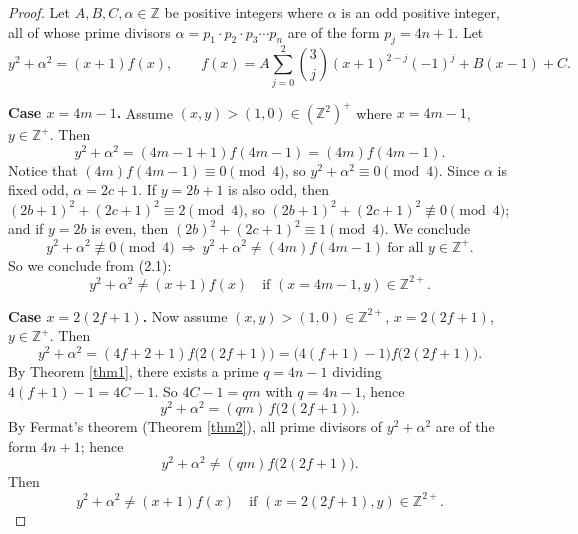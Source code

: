 \documentclass[11pt]{amsart}
\begin{document}
\begin{proof}
Let $A,B,C,\alpha\in\mathbb{Z}$ be positive integers where $\alpha$ is an odd positive integer, all of whose prime divisors $\alpha=p_1\cdot p_2\cdot p_3\cdots p_n$ are of the form $p_j=4n+1$. Let
\[
y^2+\alpha^2 = (x+1)f(x), \qquad f(x)=A\sum_{j=0}^2\binom{3}{j}(x+1)^{2-j}(-1)^j+B(x-1)+C.
\]

\textbf{Case $x=4m-1$.} Assume $(x,y)>(1,0)\in(\mathbb{Z}^2)^+$ where $x=4m-1$, $y\in\mathbb{Z}^+$. Then
\[
y^2+\alpha^2 = (4m-1+1)f(4m-1) = (4m)f(4m-1).
\]
Notice that $(4m)f(4m-1)\equiv 0\pmod 4$, so $y^2+\alpha^2\equiv 0\pmod 4$. Since $\alpha$ is fixed odd, $\alpha=2c+1$. If $y=2b+1$ is also odd, then $(2b+1)^2+(2c+1)^2\equiv 2\pmod 4$, so $(2b+1)^2+(2c+1)^2\not\equiv 0\pmod4$; and if $y=2b$ is even, then $(2b)^2+(2c+1)^2\equiv 1\pmod 4$. We conclude
\begin{equation}
y^2+\alpha^2\not\equiv 0\pmod 4 \ \Rightarrow\ y^2+\alpha^2\ne (4m)f(4m-1)\ \text{for all } y\in\mathbb{Z}^+. \tag{2.1}
\end{equation}
So we conclude from (2.1):
\begin{equation}
y^2+\alpha^2 \ne (x+1)f(x) \quad\text{if } (x=4m-1,y)\in\mathbb{Z}^{2+}. \tag{2.2}
\end{equation}

\textbf{Case $x=2(2f+1)$.} Now assume $(x,y)>(1,0)\in\mathbb{Z}^{2+}$, $x=2(2f+1)$, $y\in\mathbb{Z}^+$. Then
\[
y^2+\alpha^2=(4f+2+1)f\big(2(2f+1)\big) = \big(4(f+1)-1\big) f\big(2(2f+1)\big).
\]
By Theorem \ref{thm1}, there exists a prime $q=4n-1$ dividing $4(f+1)-1=4C-1$. So $4C-1=qm$ with $q=4n-1$, hence
\begin{equation}
y^2+\alpha^2 = (qm)\,f\big(2(2f+1)\big). \tag{2.3}
\end{equation}
By Fermat's theorem (Theorem \ref{thm2}), all prime divisors of $y^2+\alpha^2$ are of the form $4n+1$; hence
\begin{equation}
y^2+\alpha^2 \ne (qm)f\big(2(2f+1)\big). \tag{2.4}
\end{equation}
Then
\begin{equation}
y^2+\alpha^2 \ne (x+1)f(x) \quad\text{if } (x=2(2f+1),y)\in\mathbb{Z}^{2+}. \tag{2.5}
\end{equation}


\end{proof}
\end{document}
